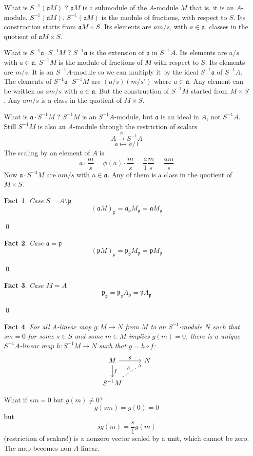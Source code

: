 \documentclass{article}
\newcommand{\mf}{\mathfrak}
\newcommand{\aaa}{\mf a}
\newcommand{\ppp}{\mf p}
\newtheorem{theorem}{Fact}[section]
\begin{document}
What is $S^{-1}(\aaa M)$ ? $\aaa M$ is a submodule of the $A$-module $M$ that is, it is an $A$-module. $S^{-1}(\aaa M)$. $S^{-1}(\aaa M)$ is the module of fractions, with respect to $S$. Its construction starts from $\aaa M \times S$. Its elements are $am/s$, with $a \in \aaa$, classes in the quotient of $\aaa M \times S$.

What is $S^{-1}\aaa \cdot S^{-1}M$ ? $S^{-1}\aaa$ is the extension of $\aaa$ in $S^{-1}A$. Its elements are $a/s$ with $a \in \aaa$. $S^{-1}M$ is the module of fractions of $M$ with respect to $S$. Its elements are $m/s$. It is an $S^{-1}A$-module so we can multiply it by the ideal $S^{-1}\aaa$ of $S^{-1}A$. The elements of $S^{-1}\aaa \cdot S^{-1}M$ are $(a/s)(m/s')$ where $a \in \aaa$. Any element can be written as $am/s$ with $a \in \aaa$. But the construction of $S^{-1}M$ started from $M \times S$. Any $am/s$ is a class in the quotient of $M \times S$.

What is $\aaa \cdot S^{-1}M$ ? $S^{-1}M$ is an $S^{-1}A$-module, but $\aaa$ is an ideal in $A$, not $S^{-1}A$. Still $S^{-1}M$ is also an $A$-module through the restriction of scalars
\[
A \overset{\phi}\rightarrow S^{-1}A
\]
\[
a \mapsto a/1
\]
The scaling by an element of $A$ is
\[
a \cdot \frac{m}{s} = \phi(a) \cdot \frac{m}{s} = \frac{a}{1}\frac{m}{s} = \frac{am}{s}
\]
Now $\aaa \cdot S^{-1}M$ are $am/s$ with $a \in \aaa$. Any of them is a class in the quotient of $M \times S$.

\begin{theorem}
Case $S = A\setminus\ppp$
\[
(\aaa M)_\ppp = \aaa_\ppp M_\ppp = \aaa M_\ppp
\]
\end{theorem}
\qed

\begin{theorem}
Case $\aaa = \ppp$
\[
(\ppp M)_\ppp = \ppp_\ppp M_\ppp = \ppp M_\ppp
\]
\end{theorem}
\qed

\begin{theorem}
Case $M = A$
\[
\ppp_\ppp = \ppp_\ppp A_\ppp = \ppp A_\ppp
\]
\end{theorem}
\qed

\begin{theorem}
For all $A$-linear map $g: M \rightarrow N$ from $M$ to an $S^{-1}$-module $N$ such that $sm = 0$ for some $s \in S$ and some $m \in M$ implies $g(m) = 0$, there is a unique $S^{-1}A$-linear map $h: S^{-1}M \rightarrow N$ such that $g = h \circ f$:
\[
     \begin{tikzcd}
     M \arrow{r}{g} \arrow{d}{f} & N \\
     S^{-1}M \arrow[dashrightarrow]{ur}{h}
     \end{tikzcd}
\]
\end{theorem}
\noindent
What if $sm = 0$ but $g(m) \neq 0$?
\[
g(sm) = g(0) = 0 
\]
but 
\[
sg(m) = \frac{s}{1}g(m)
\]
(restriction of scalars!) is a nonzero vector scaled by a unit, which cannot be zero. The map becomes non-$A$-linear.
\end{document}
